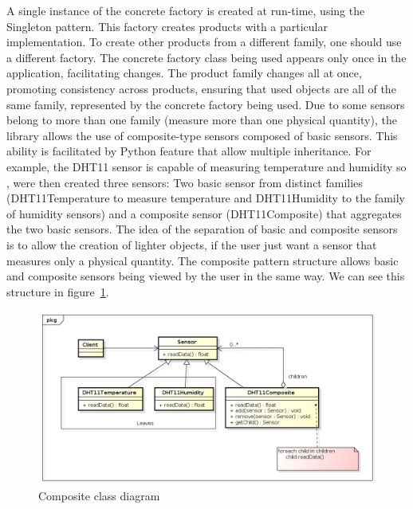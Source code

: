 \documentclass{acm_proc_article-sp}
\begin{document}
A single instance of the concrete factory is created at run-time, using the Singleton pattern. This factory creates products with a particular implementation. To create other products from a different family, one should use a different factory. The concrete factory class being used appears only once in the application, facilitating changes. The product family changes all at once, promoting consistency across products, ensuring that used objects are all of the same family, represented by the concrete factory being used.
\newline
\newline
Due to some sensors belong to more than one family (measure more than one physical quantity), the library allows the use of composite-type sensors composed of basic sensors. This ability is facilitated by Python feature that allow multiple inheritance. For example, the DHT11 sensor is capable of measuring temperature and humidity so , were then created three sensors: Two basic sensor from distinct families (DHT11Temperature to measure temperature and DHT11Humidity to the family of humidity sensors) and a composite sensor (DHT11Composite) that aggregates the two basic sensors. The idea of the separation of basic and composite sensors is to allow the creation of lighter objects, if the user just want a sensor that measures only a physical quantity. The composite pattern structure allows basic and composite sensors being viewed by the user in the same way. We can see this structure in figure~\ref{fig:composite}.
\newline
\begin{figure}[ht]
    \includegraphics[width=1.0\textwidth,natwidth=610,natheight=642]{pictures/composite.png}
    \caption{Composite class diagram}
    \label{fig:composite}
\end{figure}
\end{document}

